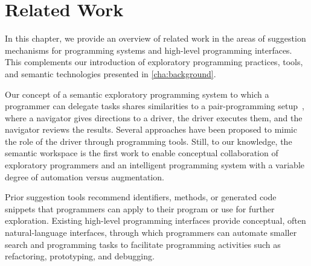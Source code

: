 
\chapter{Related Work}
\label{cha:related_work}

In this chapter, we provide an overview of related work in the areas of suggestion mechanisms for programming systems and high-level programming interfaces.
This complements our introduction of exploratory programming practices, tools, and semantic technologies presented in \cref{cha:background}.

Our concept of a semantic exploratory programming system to which a programmer can delegate tasks shares similarities to a pair-programming setup~\cite{beck2000extreme}, where a navigator gives directions to a driver, the driver executes them, and the navigator reviews the results.
Several approaches have been proposed to mimic the role of the driver through programming tools.
Still, to our knowledge, the semantic workspace is the first work to enable conceptual collaboration of exploratory programmers and an intelligent programming system with a variable degree of automation versus augmentation.


\begin{summary}
	Prior suggestion tools recommend identifiers, methods, or generated code snippets that programmers can apply to their program or use for further exploration.
	Existing high-level programming interfaces provide conceptual, often natural-language interfaces, through which programmers can automate smaller search and programming tasks to facilitate programming activities such as refactoring, prototyping, and debugging.
\end{summary}
